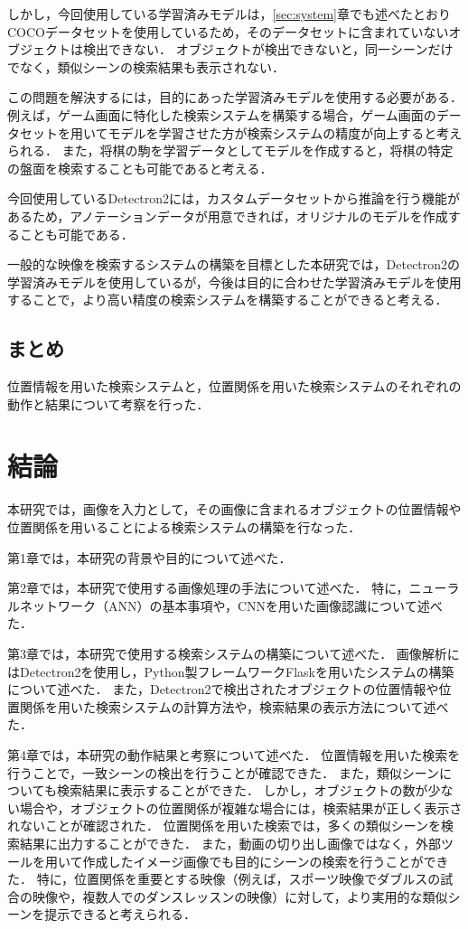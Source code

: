 \documentclass[a4j,12pt,dvipdfmx]{jreport}
\begin{document}
しかし，今回使用している学習済みモデルは，\ref{sec:system}章でも述べたとおりCOCOデータセットを使用しているため，そのデータセットに含まれていないオブジェクトは検出できない．
オブジェクトが検出できないと，同一シーンだけでなく，類似シーンの検索結果も表示されない．

この問題を解決するには，目的にあった学習済みモデルを使用する必要がある．
例えば，ゲーム画面に特化した検索システムを構築する場合，ゲーム画面のデータセットを用いてモデルを学習させた方が検索システムの精度が向上すると考えられる．
また，将棋の駒を学習データとしてモデルを作成すると，将棋の特定の盤面を検索することも可能であると考える．

今回使用しているDetectron2には，カスタムデータセットから推論を行う機能があるため，アノテーションデータが用意できれば，オリジナルのモデルを作成することも可能である．

一般的な映像を検索するシステムの構築を目標とした本研究では，Detectron2の学習済みモデルを使用しているが，今後は目的に合わせた学習済みモデルを使用することで，より高い精度の検索システムを構築することができると考える．

\section{まとめ}\label{chap4-5}
位置情報を用いた検索システムと，位置関係を用いた検索システムのそれぞれの動作と結果について考察を行った．


\chapter{結論}
\label{sec:conclusion}
本研究では，画像を入力として，その画像に含まれるオブジェクトの位置情報や位置関係を用いることによる検索システムの構築を行なった．

第1章では，本研究の背景や目的について述べた．

第2章では，本研究で使用する画像処理の手法について述べた．
特に，ニューラルネットワーク（ANN）の基本事項や，CNNを用いた画像認識について述べた．

第3章では，本研究で使用する検索システムの構築について述べた．
画像解析にはDetectron2を使用し，Python製フレームワークFlaskを用いたシステムの構築について述べた．
また，Detectron2で検出されたオブジェクトの位置情報や位置関係を用いた検索システムの計算方法や，検索結果の表示方法について述べた．

第4章では，本研究の動作結果と考察について述べた．
位置情報を用いた検索を行うことで，一致シーンの検出を行うことが確認できた．
また，類似シーンについても検索結果に表示することができた．
しかし，オブジェクトの数が少ない場合や，オブジェクトの位置関係が複雑な場合には，検索結果が正しく表示されないことが確認された．
位置関係を用いた検索では，多くの類似シーンを検索結果に出力することができた．
また，動画の切り出し画像ではなく，外部ツールを用いて作成したイメージ画像でも目的にシーンの検索を行うことができた．
特に，位置関係を重要とする映像（例えば，スポーツ映像でダブルスの試合の映像や，複数人でのダンスレッスンの映像）に対して，より実用的な類似シーンを提示できると考えられる．
\end{document}

